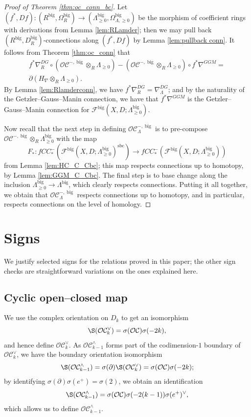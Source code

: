 \documentclass{article}
\def\fuk{\EuF}
\def\cO{\mathcal{O}}
\def\cC{\mathcal{C}}
\def\fuk{\mathcal{F}}
\def\big{{\operatorname{big}}}
\def\sbc{{\operatorname{sbc}}}
\begin{document}
\begin{proof}[Proof of Theorem \ref{thm:oc_conn_bc}]
    Let $(f^*,Df): (R^\big,\Omega^\big_R) \to (\Lambda^\big_{\ge 0},\Omega^\big_{\Lambda,\ge 0})$ be the morphism of coefficient rings with derivations from Lemma \ref{lem:RLamder}; then we may pull back $(R^\big,D^\big_R)$-connections along $(f^*,Df)$ by Lemma \ref{lem:pullback conn}. 
    It follows from Theorem \ref{thm:oc_conn} that
    \begin{multline}
        f^*\nabla^{DG}_R \circ (\cO\cC^{-,\big} \otimes_R \Lambda_{\ge 0}) - (\cO\cC^{-,\big} \otimes_R \Lambda_{\ge 0}) \circ f^*\nabla^{GGM} =\\ \partial (H_\nabla \otimes_R \Lambda_{\ge 0}) .
    \end{multline}
    By Lemma \ref{lem:Rlamderconn}, we have $f^*\nabla^{DG}_R = \nabla^{DG}_\Lambda$; and by the naturality of the Getzler--Gauss--Manin connection, we have that $f^*\nabla^{GGM}$ is the Getzler--Gauss--Manin connection for $\fuk^\big(X,D;\Lambda^\big_{\ge 0})$. 

    Now recall that the next step in defining $\cO\cC^{-,\big}_\Lambda$ is to pre-compose $\cO\cC^{-,\big} \otimes_R \Lambda^\big_{\ge 0}$ with the map 
    $$F_*:fCC_*^-(\fuk^\big(X,D;\Lambda^\big_{\ge 0})^\sbc) \to fCC_*^-(\fuk^\big(X,D;\Lambda^\big_{\ge 0}))$$ from Lemma \ref{lem:HC_C_Cbc}; this map respects connections up to homotopy, by Lemma \ref{lem:GGM_C_Cbc}.
    The final step is to base change along the inclusion $\Lambda^\big_{\ge 0} \to \Lambda^\big$, which clearly respects connections. 
    Putting it all together, we obtain that $\cO\cC^{-,\big}_\Lambda$ respects connections up to homotopy, and in particular, respects connections on the level of homology.
\end{proof}

\appendix

\section{Signs}\label{sec:signs}

We justify selected signs for the relations proved in this paper; the other sign checks are straightforward variations on the ones explained here.

\subsection{Cyclic open--closed map}\label{sec:cyc oc signs}

We use the complex orientation on $D_k$ to get an isomorphism
$$\S(\cO\cC^\vee_k) = \sigma(\cO\cC)\sigma(-2k),$$
and hence define $\cO\cC^\vee_k$. 
As $\cO\cC^\wedge_{k-1}$ forms part of the codimension-$1$ boundary of $\cO\cC^\vee_{k}$, we have the boundary orientation isomorphism
$$\S(\cO\cC^\wedge_{k-1}) = \sigma(\partial)\S(\cO\cC^\vee_k) = \sigma(\cO\cC)\sigma(-2k);$$
by identifying $\sigma(\partial) \sigma(e^+) = \sigma(2)$, we obtain an identification
$$\S(\cO\cC^\wedge_{k-1}) = \sigma(\cO\cC)\sigma(-2(k-1)) \sigma(e^+)^\vee,$$
which allows us to define $\cO\cC^\wedge_{k-1}$.
\end{document}

